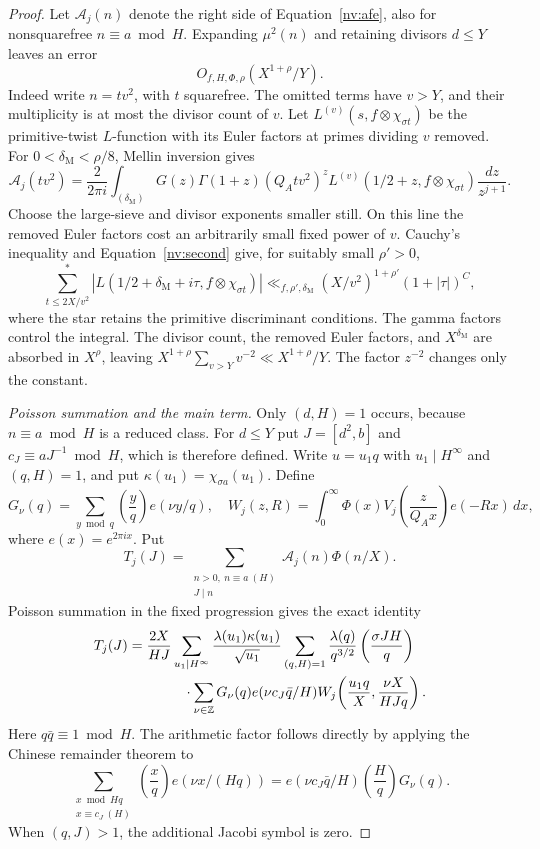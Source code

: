 \begin{proof}
Let $\mathcal A_j(n)$ denote the right side of
Equation~\eqref{nv:afe}, also for nonsquarefree $n\equiv a\bmod H$.
Expanding $\mu^2(n)$ and retaining divisors $d\le Y$ leaves an error
\begin{equation}\label{nv:tail}
 O_{f,H,\Phi,\rho}(X^{1+\rho}/Y).
\end{equation}
Indeed write $n=tv^2$, with $t$ squarefree. The omitted terms have $v>Y$,
and their multiplicity is at most the divisor count of $v$.
Let $L^{(v)}(s,f\otimes\chi_{\sigma t})$ be the primitive-twist
$L$-function with its Euler factors at primes dividing $v$ removed.
For $0<\delta_{\mathrm M}<\rho/8$, Mellin inversion gives
\[
 \mathcal A_j(tv^2)=\frac{2}{2\pi i}
 \int_{(\delta_{\mathrm M})}
 G(z)\Gamma(1+z)(Q_Atv^2)^z
 L^{(v)}(1/2+z,f\otimes\chi_{\sigma t})
 \frac{dz}{z^{j+1}}.
\]
Choose the large-sieve and divisor exponents smaller still.
On this line the removed Euler
factors cost an arbitrarily small fixed power of $v$. Cauchy's
inequality and Equation~\eqref{nv:second} give, for suitably small
$\rho'>0$,
\[
 \sum_{t\le2X/v^2}^{\!*}
 |L(1/2+\delta_{\mathrm M}+i\tau,f\otimes\chi_{\sigma t})|
 \ll_{f,\rho',\delta_{\mathrm M}}
 (X/v^2)^{1+\rho'}(1+|\tau|)^C,
\]
where the star retains the primitive discriminant conditions.
The gamma factors control the integral. The divisor count, the removed
Euler factors, and $X^{\delta_{\mathrm M}}$ are absorbed in $X^\rho$,
leaving $X^{1+\rho}\sum_{v>Y}v^{-2}\ll X^{1+\rho}/Y$.
The factor $z^{-2}$ changes only the constant.

\par\smallskip\noindent\emph{Poisson summation and the main term.}
Only $(d,H)=1$ occurs, because $n\equiv a\bmod H$ is a reduced
class. For $d\le Y$ put $J=[d^2,b]$ and
$c_J\equiv aJ^{-1}\bmod H$, which is therefore defined.
Write $u=u_1q$ with $u_1\mid H^\infty$ and $(q,H)=1$, and put
$\kappa(u_1)=\chi_{\sigma a}(u_1)$. Define
\[
 G_\nu(q)=\sum_{y\bmod q}\left(\frac yq\right)e(\nu y/q),
\quad
 W_j(z,R)=\int_0^\infty
 \Phi(x)V_j\!\left(\frac z{Q_Ax}\right)e(-Rx)\,dx,
\]
where $e(x)=e^{2\pi ix}$. Put
\[
 T_j(J)=\sum_{\substack{n>0,\ n\equiv a\ (H)\\J\mid n}}
             \mathcal A_j(n)\Phi(n/X).
\]
Poisson summation in the fixed progression gives the exact identity
\begin{align}\label{nv:poisson}
 T_j(J)
 &=\frac{2X}{HJ}
 \sum_{u_1\mid H^\infty}\frac{\lambda(u_1)\kappa(u_1)}{\sqrt{u_1}}
 \sum_{(q,H)=1}\frac{\lambda(q)}{q^{3/2}}
       \left(\frac{\sigma JH}{q}\right) \\
 &\hspace{14mm}\cdot
 \sum_{\nu\in\Z}G_\nu(q)e(\nu c_J\bar q/H)
 W_j\!\left(\frac{u_1q}{X},\frac{\nu X}{HJq}\right).
 \nonumber
\end{align}
Here $q\bar q\equiv1\bmod H$. The arithmetic factor follows directly by
applying the Chinese remainder theorem to
\[
\sum_{\substack{x\bmod Hq\\x\equiv c_J\ (H)}}
 \left(\frac xq\right)e(\nu x/(Hq))
=e(\nu c_J\bar q/H)\left(\frac Hq\right)G_\nu(q).
\]
When $(q,J)>1$, the additional Jacobi symbol is zero.


\end{proof}
